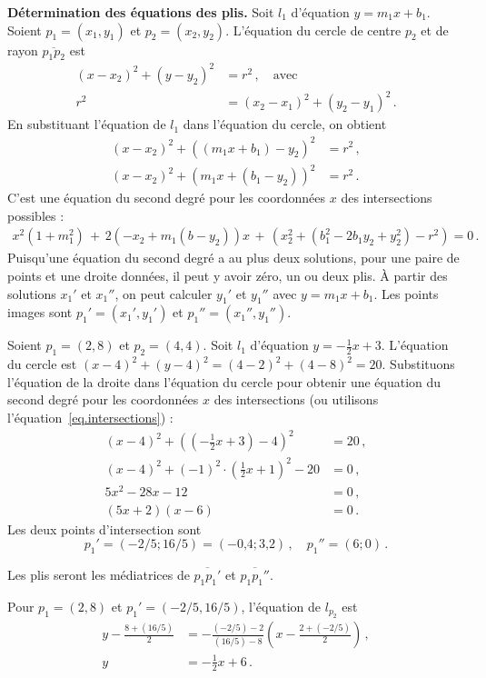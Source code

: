 \noindent\textbf{Détermination des équations des plis.}
Soit $l_1$ d'équation $y=m_1x + b_1$. Soient $p_1=(x_1,y_1)$ et  $p_2=(x_2,y_2)$. L'équation du cercle de centre $p_2$ et de rayon $\overline{p_1p_2}$ est 
\begin{align*}
(x-x_2)^2 + (y-y_2)^2 &= r^2\,,\quad \textrm{avec}\\
r^2&= (x_2-x_1)^2 + (y_2-y_1)^2\,.
\end{align*}
En substituant l'équation de $l_1$ dans l'équation du cercle, on obtient 
\begin{align*}
(x-x_2)^2+((m_1x+b_1)-y_2)^2&=r^2\,,\\
(x-x_2)^2+(m_1x+(b_1-y_2))^2&=r^2\,.
\end{align*}
C'est une équation du second degré  pour les coordonnées $x$ des intersections possibles :
\begin{align}
x^2(1+m_1^2) \,+\, 2(-x_2+m_1(b-y_2))x \,+\,(x_2^2 + (b_1^2 - 2b_1y_2+y_2^2)-r^2)=0\,.\label{eq.intersections}
\end{align}
Puisqu'une équation du second degré a au plus deux solutions, pour une paire de points et une droite données, il peut y avoir zéro, un ou deux plis. À partir des solutions $x_1'$ et $x_1''$, on peut calculer $y_1'$ et $y_1''$ avec  $y=m_1x+b_1$. Les points images sont $p_1'=(x_1',y_1')$ et $p_1''=(x_1'',y_1'')$.
\begin{example}
Soient $p_1=(2,8)$ et $p_2=(4,4)$. Soit $l_1$ d'équation  $y=-\frac{1}{2}x +3$. L'équation du cercle est $(x-4)^2 + (y-4)^2 = (4-2)^2+(4-8)^2=20$. Substituons  l'équation de la droite dans l'équation du cercle pour obtenir une équation du second degré pour les coordonnées $x$ des intersections (ou utilisons  l'équation~\ref{eq.intersections}) :
\begin{align*}
(x-4)^2 + \left(\left(-\frac{1}{2}x+3\right)-4\right)^2&=20\,,\\
(x-4)^2 + (-1)^2\cdot\left(\frac{1}{2}x+1\right)^2-20&=0\,,\\
5x^2 -28x -12&=0\,,\\
(5x+2)(x-6)&=0\,.
\end{align*}
Les deux points d'intersection sont 
\[
p_1'=(-2/5; 16/5) = (-\mbox{0,4}; \mbox{3,2})\,,\quad p_1''=(6; 0)\,.
\]
\end{example}
Les plis seront les médiatrices de $\overline{p_1p_1'}$ et $\overline{p_1p_1''}$.
\begin{example}
Pour $p_1=(2,8)$ et $p_1'=(-2/5,16/5)$, l'équation de  $l_{p_2}$  est 
\begin{align*}
y-\frac{8+(16/5)}{2}&=-\frac{(-2/5)-2}{(16/5)-8}\left(x-\frac{2+\left(-2/5\right)}{2}\right)\,,\\
y&=-\frac{1}{2}x+6\,.
\end{align*}
\end{example}

